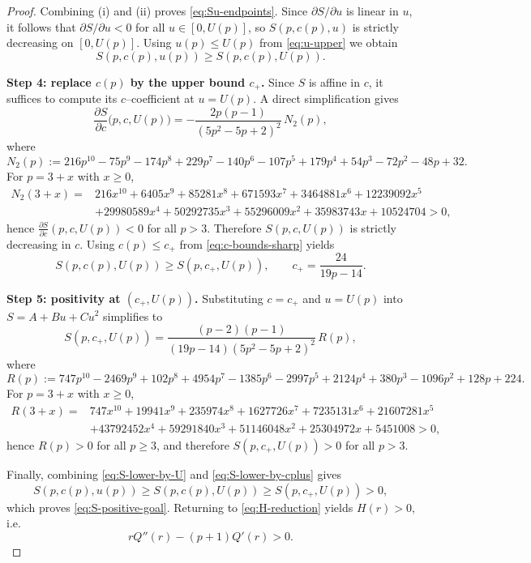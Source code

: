 \documentclass[10pt,a4paper]{amsart}
\begin{document}
\begin{proof}
Combining (i) and (ii) proves \eqref{eq:Su-endpoints}. Since $\partial S/\partial u$
is linear in $u$, it follows that $\partial S/\partial u<0$ for all $u\in[0,U(p)]$,
so $S(p,c(p),u)$ is strictly decreasing on $[0,U(p)]$. Using $u(p)\le U(p)$
from \eqref{eq:u-upper} we obtain
\begin{equation}\label{eq:S-lower-by-U}
S(p,c(p),u(p))\ge S(p,c(p),U(p)).
\end{equation}

\medskip
\noindent\textbf{Step 4: replace $c(p)$ by the upper bound $c_+$.}
Since $S$ is affine in $c$, it suffices to compute its $c$--coefficient at $u=U(p)$.
A direct simplification gives
\[
\frac{\partial S}{\partial c}\bigl(p,c,U(p)\bigr)
=
-\frac{2p(p-1)}{(5p^2-5p+2)^2}\,N_2(p),
\]
where
\[
N_2(p):=216p^{10}-75p^9-174p^8+229p^7-140p^6-107p^5+179p^4+54p^3-72p^2-48p+32.
\]
For $p=3+x$ with $x\ge0$,
\begin{align*}
N_2(3+x)=&
216x^{10}+6405x^9+85281x^8+671593x^7+3464881x^6+12239092x^5\\&
+29980589x^4+50292735x^3+55296009x^2+35983743x+10524704>0,
\end{align*}
hence $\frac{\partial S}{\partial c}(p,c,U(p))<0$ for all $p>3$.
Therefore $S(p,c,U(p))$ is strictly decreasing in $c$.
Using $c(p)\le c_+$ from \eqref{eq:c-bounds-sharp} yields
\begin{equation}\label{eq:S-lower-by-cplus}
S(p,c(p),U(p))\ge S(p,c_+,U(p)),
\qquad
c_+=\frac{24}{19p-14}.
\end{equation}

\medskip
\noindent\textbf{Step 5: positivity at $(c_+,U(p))$.}
Substituting $c=c_+$ and $u=U(p)$ into $S=A+Bu+Cu^2$ simplifies to
\[
S(p,c_+,U(p))
=
\frac{(p-2)(p-1)}{(19p-14)(5p^2-5p+2)^2}\,R(p),
\]
where
\[
R(p):=747p^{10}-2469p^9+102p^8+4954p^7-1385p^6-2997p^5+2124p^4+380p^3-1096p^2+128p+224.
\]
For $p=3+x$ with $x\ge0$,
\begin{align*}
R(3+x)=&
747x^{10}+19941x^9+235974x^8+1627726x^7+7235131x^6+21607281x^5\\&
+43792452x^4+59291840x^3+51146048x^2+25304972x+5451008>0,
\end{align*}
hence $R(p)>0$ for all $p\ge3$, and therefore $S(p,c_+,U(p))>0$ for all $p>3$.

Finally, combining \eqref{eq:S-lower-by-U} and \eqref{eq:S-lower-by-cplus} gives
\[
S(p,c(p),u(p))\ge S(p,c(p),U(p))\ge S(p,c_+,U(p))>0,
\]
which proves \eqref{eq:S-positive-goal}. Returning to \eqref{eq:H-reduction} yields
$H(r)>0$, i.e.
\[
rQ''(r)-(p+1)Q'(r)>0.
\]
\end{proof}
\end{document}
